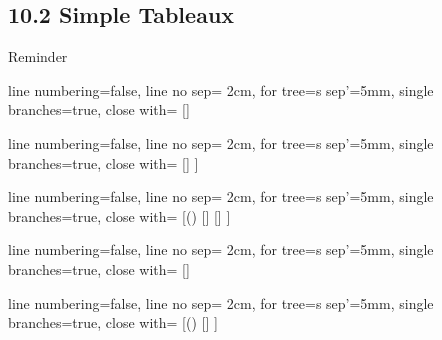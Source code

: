 \subsection{10.2 Simple Tableaux}

\begin{frame}{Reminder}

		
			\begin{center}		
					\begin{prooftree}
					{
					line numbering=false,
					line no sep= 2cm,
					for tree={s sep'=5mm},
					single branches=true,
					close with=\xmark
					}
					[\neg\neg \phi [\phi ] ]
					\end{prooftree}
					\begin{prooftree}
					{
					line numbering=false,
					line no sep= 2cm,
					for tree={s sep'=5mm},
					single branches=true,
					close with=\xmark
					}
					[\phi\land\psi [\phi [\psi ] ] ]
					\end{prooftree}
					\begin{prooftree}
					{
					line numbering=false,
					line no sep= 2cm,
					for tree={s sep'=5mm},
					single branches=true,
					close with=\xmark
					}
					[\neg (\phi\land\psi) [\neg \phi ] [\neg \psi ] ]
					\end{prooftree}
					\begin{prooftree}
					{
					line numbering=false,
					line no sep= 2cm,
					for tree={s sep'=5mm},
					single branches=true,
					close with=\xmark
					}
					[\phi\lor\psi [\phi ] [\psi ] ]
					\end{prooftree}
					\begin{prooftree}
					{
					line numbering=false,
					line no sep= 2cm,
					for tree={s sep'=5mm},
					single branches=true,
					close with=\xmark
					}
					[\neg(\phi\lor\psi) [\neg\phi [\neg\psi ] ] ]
					\end{prooftree}

					\vspace{2ex}


\end{center}
\end{frame}
